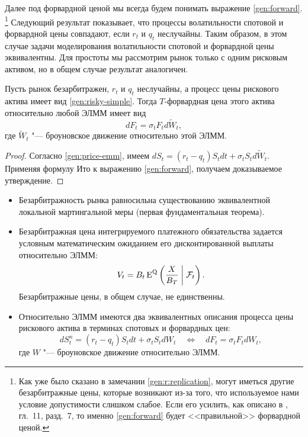 Далее под форвардной ценой мы всегда будем понимать выражение \eqref{gen:forward}.%
\footnote{Как уже было сказано в замечании \ref{gen:r:replication}, могут иметься другие безарбитражные цены, которые возникают из-за того, что используемое нами условие допустимости слишком слабое.
Если его усилить, как описано в \cite{EberleinKallsen19}, гл.~11, разд.~7, то именно \eqref{gen:forward} будет <<правильной>> форвардной ценой.}
Следующий результат показывает, что процессы волатильности спотовой и форвардной цены совпадают, если $r_t$ и $q_t$ неслучайны.
Таким образом, в этом случае задачи моделирования волатильности спотовой и форвардной цены эквивалентны.
Для простоты мы рассмотрим рынок только с одним рисковым активом, но в общем случае результат аналогичен.


\begin{proposition}
\label{gen:c:forward-vol}
Пусть рынок безарбитражен, $r_t$ и $q_t$ неслучайны, а процесс цены рискового актива имеет вид \eqref{gen:risky-simple}.
Тогда $T$-форвардная цена этого актива относительно любой ЭЛММ имеет вид
\[
d F_t = \sigma_t F_t d \tilde W_t,
\] 
где $\tilde W_t$ "--- броуновское движение относительно этой ЭЛММ.
\end{proposition}

\begin{proof}
Согласно \eqref{gen:price-emm}, имеем $dS_t = (r_t-q_t) S_t dt + \sigma_t S_t d\tilde W_t$. 
Применяя формулу Ито к выражению \eqref{gen:forward}, получаем доказываемое утверждение.
\end{proof}


\summary

\begin{itemize}
\item Безарбитражность рынка равносильна существованию эквивалентной локальной мартингальной меры (первая фундаментальная теорема).

\item Безарбитражная цена интегрируемого платежного обязательства задается условным математическим ожиданием его дисконтированной выплаты относительно ЭЛММ:
\[
V_t = B_t \operatorname{E}^{\mathrm{Q}} \left(\frac{X}{B_T} \;\bigg|\; \mathcal{F}_t\right).
\]
Безарбитражные цены, в общем случае, не единственны.

\item Относительно ЭЛММ имеются два эквивалентных описания процесса цены рискового актива в терминах спотовых и форвардных цен:
\[
dS_t^n = (r_t-q_t) S_t dt + \sigma_t S_t d W_t
\quad\iff\quad
d F_t = \sigma_t F_t d W_t,
\]
где $W$ "--- броуновское движение относительно ЭЛММ.
\end{itemize}
